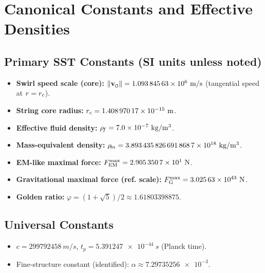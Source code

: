 \documentclass[11pt]{article}
\begin{document}
\section{Canonical Constants and Effective Densities}
\label{sec:canonical_constants}
\subsection*{Primary SST Constants (SI units unless noted)}
    \begin{itemize}
    \item \textbf{Swirl speed scale (core):} $\vnorm = \num{1.09384563e6}\ \si{m/s}$ (tangential speed at $r=\rc$).
    \item \textbf{String core radius:} $\rc = \num{1.40897017e-15}\ \si{m}$.
    \item \textbf{Effective fluid density:} $\rhof = \num{7.0e-7}\ \si{kg/m^3}$.
    \item \textbf{Mass-equivalent density:} $\rhom = \num{3.8934358266918687e18}\ \si{kg/m^3}$.
    \item \textbf{EM-like maximal force:} $\FmaxEM = \num{2.9053507e1}\ \si{N}$.
    \item \textbf{Gravitational maximal force (ref. scale):} $\FmaxG = \num{3.02563e43}\ \si{N}$.
    \item \textbf{Golden ratio:} $\varphi = (1+\sqrt{5})/2 \approx \num{1.61803398875}$.
    \end{itemize}

\subsection*{Universal Constants}
    \begin{itemize}
    \item $c=\num{299792458}\ \si{m/s}$, \quad $t_p=\num{5.391247e-44}\ \si{s}$ (Planck time).
    \item Fine-structure constant (identified): $\alpha \approx \num{7.29735256e-3}$.
    \end{itemize}
\end{document}
